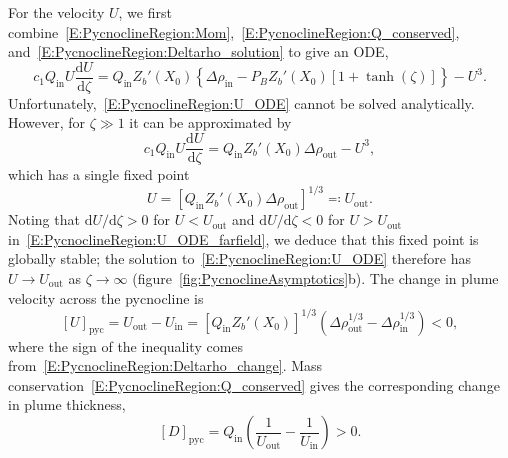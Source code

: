 \documentclass{jfm}
\newcommand{\dd}[2]{\frac{\mathrm{d} #1}{\mathrm{d} #2}}
\newcommand{\Pb}{\textit{P}_B}  %
\newcommand{\cone}{c_1}  %
\renewcommand{\in}{\text{in}} %
\newcommand{\out}{\text{out}}
\begin{document}
For the velocity $U$, we first combine~\eqref{E:PycnoclineRegion:Mom},~\eqref{E:PycnoclineRegion:Q_conserved}, and~\eqref{E:PycnoclineRegion:Deltarho_solution} to give an ODE, 
\begin{equation}\label{E:PycnoclineRegion:U_ODE}
\cone Q_\in U \dd{U}{\zeta} = Q_\in Z_b'(X_0)\left\{\Delta \rho_\in - \Pb Z_b'(X_0) \left[1 + \tanh(\zeta)\right]\right\} - U^3.
\end{equation}
Unfortunately,~\eqref{E:PycnoclineRegion:U_ODE} cannot be solved analytically. However, for $\zeta \gg 1$ it can be approximated by
\begin{equation}\label{E:PycnoclineRegion:U_ODE_farfield}
\cone Q_\in U \dd{U}{\zeta} = Q_\in Z_b'(X_0)\Delta \rho_\out - U^3,
\end{equation}
which has a single fixed point 
\begin{equation}\label{E:PycnoclineRegion:U_Limit}
U = \left[ Q_\in Z_b'(X_0)\Delta \rho_\out\right]^{1/3}  \eqcolon U_\out.
\end{equation}
Noting that $\mathrm{d}U/\mathrm{d}\zeta > 0$  for $U < U_\out$ and $\mathrm{d}U/\mathrm{d}\zeta < 0$  for $U > U_\out$ in~\eqref{E:PycnoclineRegion:U_ODE_farfield}, we deduce that this fixed point is globally stable; the solution to~\eqref{E:PycnoclineRegion:U_ODE} therefore has $U \to U_\out$ as $\zeta \to \infty$ (figure~\ref{fig:PycnoclineAsymptotics}b). The change in plume velocity across the pycnocline is
\begin{equation}\label{E:PycnoclineRegion:U_change}
\left[U\right]_{\text{pyc}} = U_\out - U_\in = \left[Q_\in Z_b'(X_0)\right]^{1/3} \left(\Delta \rho_\out^{1/3} - \Delta \rho_\in^{1/3}\right) < 0,
\end{equation}
where the sign of the inequality comes from~\eqref{E:PycnoclineRegion:Deltarho_change}. Mass conservation~\eqref{E:PycnoclineRegion:Q_conserved} gives the corresponding change in plume thickness,
\begin{equation}\label{E:PycnoclineRegion:D_change}
\left[D\right]_{\text{pyc}} = Q_\in \left(\frac{1}{U_\out} - \frac{1}{U_\in}\right) > 0.
\end{equation}
\end{document}
